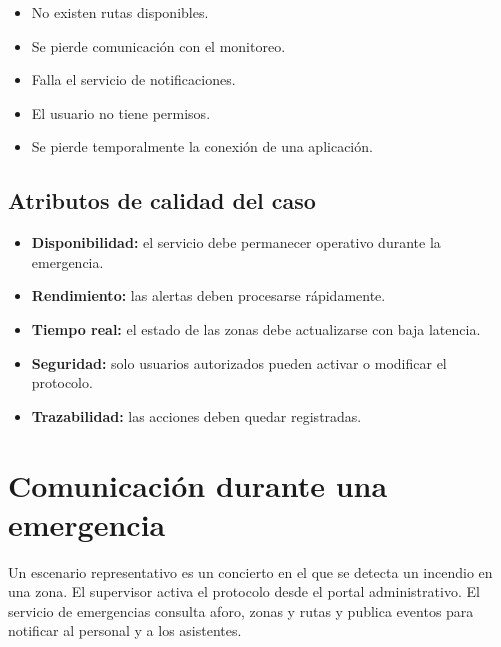 \documentclass[12pt,a4paper]{article}
\begin{document}
\begin{itemize}
\item No existen rutas disponibles.
\item Se pierde comunicación con el monitoreo.
\item Falla el servicio de notificaciones.
\item El usuario no tiene permisos.
\item Se pierde temporalmente la conexión de una aplicación.
\end{itemize}

\subsection{Atributos de calidad del caso}

\begin{itemize}
\item \textbf{Disponibilidad:} el servicio debe permanecer operativo durante la emergencia.
\item \textbf{Rendimiento:} las alertas deben procesarse rápidamente.
\item \textbf{Tiempo real:} el estado de las zonas debe actualizarse con baja latencia.
\item \textbf{Seguridad:} solo usuarios autorizados pueden activar o modificar el protocolo.
\item \textbf{Trazabilidad:} las acciones deben quedar registradas.
\end{itemize}

\section{Comunicación durante una emergencia}

Un escenario representativo es un concierto en el que se detecta un incendio en una zona. El supervisor activa el protocolo desde el portal administrativo. El servicio de emergencias consulta aforo, zonas y rutas y publica eventos para notificar al personal y a los asistentes.

\begin{center}
\end{center}
\end{document}
